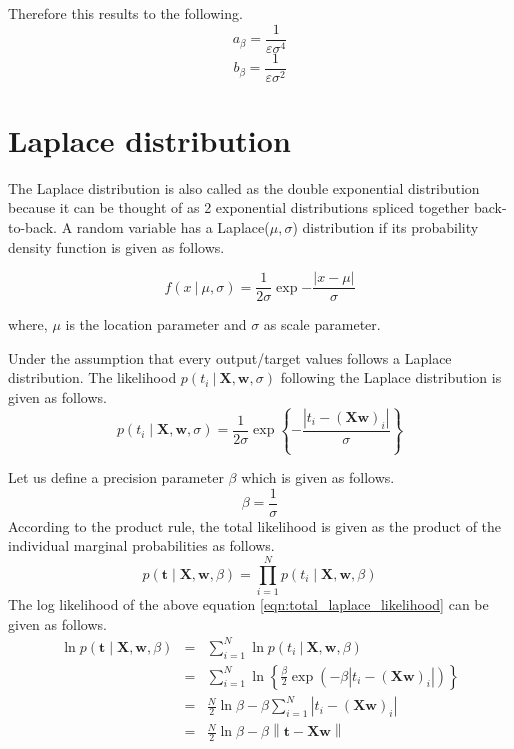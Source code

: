\documentclass[11pt]{article}
\newcommand\given[1][]{\:#1\vert\:}
\newcommand{\norm}[1]{\left\lVert#1\right\rVert}
\begin{document}
Therefore this results to the following.
\begin{equation}
    a_{\beta} = \frac{1}{\varepsilon\sigma^4}
\end{equation}
\begin{equation}
    b_{\beta} = \frac{1}{\varepsilon\sigma^2}
\end{equation}

\section{Laplace distribution}

The Laplace distribution is also called as the double exponential distribution because it can be thought of as 2 exponential distributions spliced together back-to-back. A random variable has a Laplace($\mu, \sigma$) distribution if its probability density function is given as follows.

\begin{equation}
    f(x \given \mu, \sigma) = \frac{1}{2\sigma}\exp{-\frac{\left\lvert x - \mu \right\rvert}{\sigma}}
\end{equation}

where, $\mu$ is the location parameter and $\sigma$ as scale parameter. 

Under the assumption that every output/target values follows a Laplace distribution. The likelihood  $p(t_i \given \bm{X}, \bm{w}, \sigma)$ following the Laplace distribution is given as follows.
\begin{equation}
    p(t_i \mid \bm{X}, \bm{w}, \sigma) = \frac{1}{2\sigma}\exp\left\{{-\frac{\left\lvert t_i - (\bm{X w})_i \right\lvert}{\sigma}}\right\}
\end{equation}

Let us define a precision parameter $\beta$ which is given as follows.
\begin{equation}
    \beta = \frac{1}{\sigma}
\end{equation}
According to the product rule, the total likelihood is given as the product of the individual marginal probabilities as follows.
\begin{equation}\label{eqn:total_laplace_likelihood}
    p(\bm{t} \mid \bm{X}, \bm{w}, \beta) = \prod_{i=1}^Np(t_i \mid \bm{X}, \bm{w}, \beta)
\end{equation}
The log likelihood of the above equation \ref{eqn:total_laplace_likelihood} can be given as follows.
\begin{eqnarray}
    \ln{p(\bm{t} \mid \bm{X}, \bm{w}, \beta)} 
    &=& 
    \sum_{i=1}^N \ln p(t_i \given \bm{X}, \bm{w}, \beta) \\
    &=&
    \sum_{i=1}^N \ln{\left\{\frac{\beta}{2}\exp{\left(-\beta \left\lvert t_i - (\bm{X w})_i \right\lvert \right)}\right\}} \\
    &=&
    \frac{N}{2}\ln{\beta} - \beta \sum_{i=1}^N \left\lvert t_i - (\bm{X w})_i \right\lvert \\
    &=&
    \frac{N}{2}\ln{\beta} - \beta \norm{\bm{t} - \bm{X w}}
\end{eqnarray}
\end{document}
